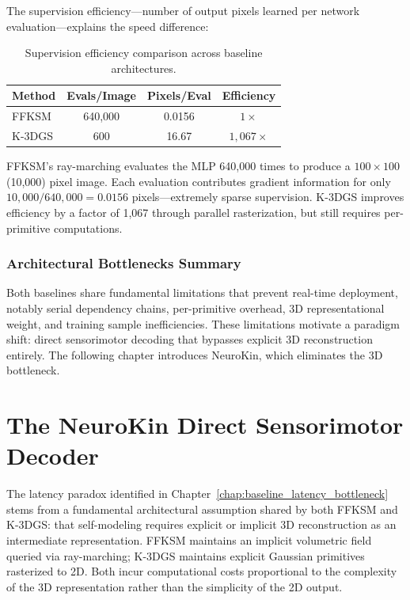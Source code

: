 \documentclass[12pt,a4paper,oneside]{report}
\begin{document}
The supervision efficiency---number of output pixels learned per network evaluation---explains the speed difference:

\begin{table}[H]
\centering
\caption{Supervision efficiency comparison across baseline architectures.}
\label{tab:supervision_efficiency_baseline}
\begin{tabular}{lccc}
\toprule
\textbf{Method} & \textbf{Evals/Image} & \textbf{Pixels/Eval} & \textbf{Efficiency} \\
\midrule
FFKSM & 640,000 & 0.0156 & $1\times$ \\
K-3DGS & 600 & 16.67 & $1,067\times$ \\
\bottomrule
\end{tabular}
\end{table}

\begin{sloppypar}
FFKSM's ray-marching evaluates the MLP 640,000 times to produce a $100\times100$ (10,000) pixel image. Each evaluation contributes gradient information for only $10{,}000/640{,}000 = 0.0156$ pixels---extremely sparse supervision. K-3DGS improves efficiency by a factor of 1,067 through parallel rasterization, but still requires per-primitive computations.
\end{sloppypar}

\subsection{Architectural Bottlenecks Summary}

Both baselines share fundamental limitations that prevent real-time deployment, notably serial dependency chains, per-primitive overhead, 3D representational weight, and training sample inefficiencies. These limitations motivate a paradigm shift: direct sensorimotor decoding that bypasses explicit 3D reconstruction entirely. The following chapter introduces NeuroKin, which eliminates the 3D bottleneck.

\clearpage

\chapter{The NeuroKin Direct Sensorimotor Decoder}
\label{chap:neurokin_decoder}

The latency paradox identified in Chapter~\ref{chap:baseline_latency_bottleneck} stems from a fundamental architectural assumption shared by both FFKSM and K-3DGS: that self-modeling requires explicit or implicit 3D reconstruction as an intermediate representation. FFKSM maintains an implicit volumetric field queried via ray-marching; K-3DGS maintains explicit Gaussian primitives rasterized to 2D. Both incur computational costs proportional to the complexity of the 3D representation rather than the simplicity of the 2D output.
\end{document}
